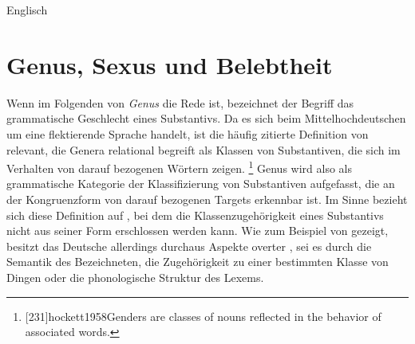 \begin{exe}
\ex\label{ex:engartdiscong}
	\langinfo%
		{Englisch}
		{}
		{\cite[nach][70]{kingdalrymple2004}}
	\begin{xlist}
		\label{ex:engartdiscong_1}
		\label{ex:engartdiscong_2}
		\label{ex:engartdiscong_3}
		\label{ex:engartdiscong_4}
	\end{xlist}
\end{exe}



\section{Genus, Sexus und Belebtheit}
\label{sec:gendsex}


Wenn im Folgenden von \textit{Genus} die Rede ist, bezeichnet der Begriff das
grammatische Geschlecht eines Substantivs. Da es sich beim
Mittelhochdeutschen um eine flektierende Sprache handelt,
ist die häufig zitierte Definition von \citet[231]{hockett1958} relevant, die
Genera relational begreift als Klassen von Substantiven, die sich im Verhalten
von darauf bezogenen Wörtern zeigen.%
%
	\footnote{[231]{hockett1958}{Genders are classes
		of nouns reflected in the behavior of associated words}.}
%
Genus wird also als grammatische Kategorie der Klassifizierung von
Substantiven aufgefasst, die an der Kongruenzform von darauf
bezogenen Targets erkennbar ist. Im Sinne
 bezieht sich diese Definition auf , bei dem die Klassenzugehörigkeit eines Substantivs
nicht aus seiner Form erschlossen werden kann. Wie zum Beispiel von
\citet{koepckezubin2017} gezeigt, besitzt das Deutsche
allerdings durchaus Aspekte overter , sei es durch die
Semantik des Bezeichneten, die Zugehörigkeit zu einer bestimmten Klasse von
Dingen oder die phonologische Struktur des Lexems.

